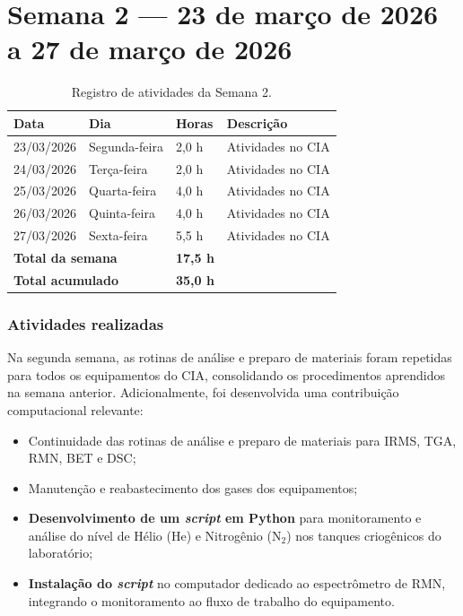 
\section{Semana 2 --- 23 de março de 2026 a 27 de março de 2026}

\begin{table}[H]
\centering
\caption{Registro de atividades da Semana 2.}
\begin{tabular}{llll}
\toprule
\textbf{Data} & \textbf{Dia} & \textbf{Horas} & \textbf{Descrição} \\
\midrule
23/03/2026 & Segunda-feira & 2,0 h & Atividades no CIA \\
24/03/2026 & Terça-feira & 2,0 h & Atividades no CIA \\
25/03/2026 & Quarta-feira & 4,0 h & Atividades no CIA \\
26/03/2026 & Quinta-feira & 4,0 h & Atividades no CIA \\
27/03/2026 & Sexta-feira & 5,5 h & Atividades no CIA \\
\midrule
\multicolumn{2}{l}{\textbf{Total da semana}} & \textbf{17,5 h} & \\
\multicolumn{2}{l}{\textbf{Total acumulado}} & \textbf{35,0 h} & \\
\bottomrule
\end{tabular}
\end{table}

\subsubsection*{Atividades realizadas}

Na segunda semana, as rotinas de análise e preparo de materiais foram
repetidas para todos os equipamentos do CIA, consolidando os procedimentos
aprendidos na semana anterior. Adicionalmente, foi desenvolvida uma
contribuição computacional relevante:

\begin{itemize}
    \item Continuidade das rotinas de análise e preparo de materiais para
          IRMS, TGA, RMN, BET e DSC;
    \item Manutenção e reabastecimento dos gases dos equipamentos;
    \item \textbf{Desenvolvimento de um \textit{script} em Python} para
          monitoramento e análise do nível de Hélio (He) e Nitrogênio
          ($\text{N}_2$) nos tanques criogênicos do laboratório;
    \item \textbf{Instalação do \textit{script}} no computador dedicado ao
          espectrômetro de RMN, integrando o monitoramento ao fluxo de
          trabalho do equipamento.
\end{itemize}

